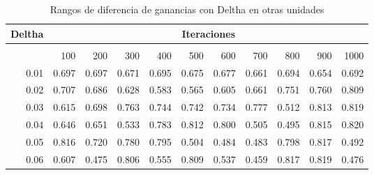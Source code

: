 \begin{table}[h]
\small

\caption{Rangos de diferencia de ganancias con Deltha en otras unidades}
\begin{tabular}{rrrrrrrrrrr} 
\multicolumn{1}{l}{Deltha} & \multicolumn{10}{c}{Iteraciones}      \\ \hline                                                                                                                                                                                              \\
\multicolumn{1}{l}{}       & 100                  & 200                  & 300                  & 400                  & 500                  & 600                  & 700                  & 800                  & 900                  & 1000                 \\
0.01                       & 0.697                & 0.697                & 0.671                & 0.695                & 0.675                & 0.677                & 0.661                & 0.694                & 0.654                & 0.692                \\
0.02                       & 0.707                & 0.686                & 0.628                & 0.583                & 0.565                & 0.605                & 0.661                & 0.751                & 0.760                & 0.809                \\
0.03                       & 0.615                & 0.698                & 0.763                & 0.744                & 0.742                & 0.734                & 0.777                & 0.512                & 0.813                & 0.819                \\
0.04                       & 0.646                & 0.651                & 0.533                & 0.783                & 0.812                & 0.800                & 0.505                & 0.495                & 0.815                & 0.820                \\
0.05                       & 0.816                & 0.720                & 0.780                & 0.795                & 0.504                & 0.484                & 0.483                & 0.798                & 0.817                & 0.492                \\
0.06                       & 0.607                & 0.475                & 0.806                & 0.555                & 0.809                & 0.537                & 0.459                & 0.817                & 0.819                & 0.476                \\

\end{tabular}
\end{table}
